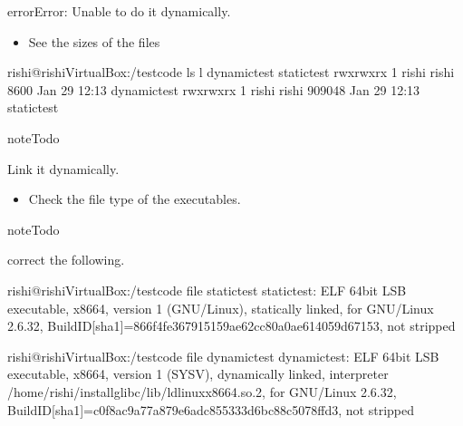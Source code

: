 \documentclass[letterpaper,10pt,english]{sphinxmanual}
\begin{document}
\begin{sphinxadmonition}{error}{Error:}
Unable to do it dynamically.
\end{sphinxadmonition}
\begin{itemize}
\item {} 
See the sizes of the files

\end{itemize}

\begin{sphinxVerbatim}[commandchars=\\\{\}]
rishi@rishi\PYGZhy{}VirtualBox:\PYGZti{}/test\PYGZus{}code\PYGZdl{} ls \PYGZhy{}l dynamic\PYGZhy{}test static\PYGZhy{}test
\PYGZhy{}rwxrwxr\PYGZhy{}x  1 rishi rishi   8600 Jan 29 12:13 dynamic\PYGZhy{}test
\PYGZhy{}rwxrwxr\PYGZhy{}x  1 rishi rishi 909048 Jan 29 12:13 static\PYGZhy{}test
\end{sphinxVerbatim}

\begin{sphinxadmonition}{note}{Todo}

Link it dynamically.
\end{sphinxadmonition}
\begin{itemize}
\item {} 
Check the file type of the executables.

\end{itemize}

\begin{sphinxadmonition}{note}{Todo}

correct the following.
\end{sphinxadmonition}

\begin{sphinxVerbatim}[commandchars=\\\{\}]
rishi@rishi\PYGZhy{}VirtualBox:\PYGZti{}/test\PYGZus{}code\PYGZdl{} file static\PYGZhy{}test
static\PYGZhy{}test: ELF 64\PYGZhy{}bit LSB executable, x86\PYGZhy{}64, version 1 (GNU/Linux), statically linked, for GNU/Linux 2.6.32, BuildID[sha1]=866f4fe367915159ae62cc80a0ae614059d67153, not stripped
\end{sphinxVerbatim}

\begin{sphinxVerbatim}[commandchars=\\\{\}]
rishi@rishi\PYGZhy{}VirtualBox:\PYGZti{}/test\PYGZus{}code\PYGZdl{} file dynamic\PYGZhy{}test
dynamic\PYGZhy{}test: ELF 64\PYGZhy{}bit LSB executable, x86\PYGZhy{}64, version 1 (SYSV), dynamically linked, interpreter /home/rishi/install\PYGZus{}glibc/lib/ld\PYGZhy{}linux\PYGZhy{}x86\PYGZhy{}64.so.2, for GNU/Linux 2.6.32, BuildID[sha1]=c0f8ac9a77a879e6adc855333d6bc88c5078ffd3, not stripped
\end{sphinxVerbatim}
\end{document}

